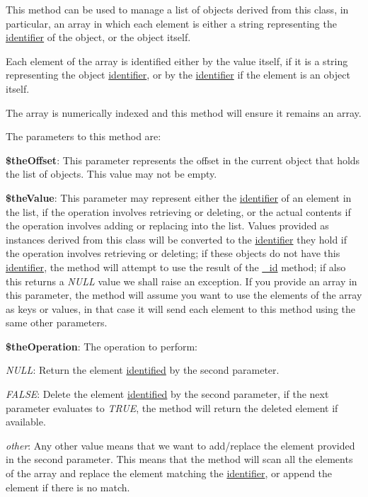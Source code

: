This method can be used to manage a list of objects derived from this class, in particular, an array in which each element is either a string representing the \hyperlink{}{identifier} of the object, or the object itself.

Each element of the array is identified either by the value itself, if it is a string representing the object \hyperlink{}{identifier}, or by the \hyperlink{}{identifier} if the element is an object itself.

The array is numerically indexed and this method will ensure it remains an array.

The parameters to this method are\-:


\begin{DoxyItemize}
\item {\bfseries \$the\-Offset}\-: This parameter represents the offset in the current object that holds the list of objects. This value may not be empty. 
\item {\bfseries \$the\-Value}\-: This parameter may represent either the \hyperlink{}{identifier} of an element in the list, if the operation involves retrieving or deleting, or the actual contents if the operation involves adding or replacing into the list. Values provided as instances derived from this class will be converted to the \hyperlink{}{identifier} they hold if the operation involves retrieving or deleting; if these objects do not have this \hyperlink{}{identifier}, the method will attempt to use the result of the \hyperlink{class_c_persistent_unit_object_ad1ca0920cf0df3c24351402f9afbf34b}{\-\_\-id} method; if also this returns a {\itshape N\-U\-L\-L\/} value we shall raise an exception. If you provide an array in this parameter, the method will assume you want to use the elements of the array as keys or values, in that case it will send each element to this method using the same other parameters. 
\item {\bfseries \$the\-Operation}\-: The operation to perform\-: 
\begin{DoxyItemize}
\item {\itshape N\-U\-L\-L\/}\-: Return the element \hyperlink{}{identified} by the second parameter. 
\item {\itshape F\-A\-L\-S\-E\/}\-: Delete the element \hyperlink{}{identified} by the second parameter, if the next parameter evaluates to {\itshape T\-R\-U\-E\/}, the method will return the deleted element if available. 
\item {\itshape other\/}\-: Any other value means that we want to add/replace the element provided in the second parameter. This means that the method will scan all the elements of the array and replace the element matching the \hyperlink{}{identifier}, or append the element if there is no match. 

\end{DoxyItemize}
\end{DoxyItemize}
